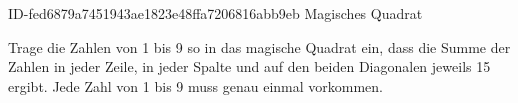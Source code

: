 \begin{exercise}
      {ID-fed6879a7451943ae1823e48ffa7206816abb9eb}
      {Magisches Quadrat}
  \ifproblem\problem
    \begin{minipage}{0.6\textwidth}
      Trage die Zahlen von 1 bis 9 so in das magische Quadrat ein, dass die Summe der
      Zahlen in jeder Zeile, in jeder Spalte und auf den beiden Diagonalen jeweils
      15 ergibt. Jede Zahl von 1 bis 9 muss genau einmal vorkommen.
    \end{minipage}\hfill
    \begin{minipage}{0.35\textwidth}
      \centering
    \end{minipage}
  \fi
\end{exercise}
